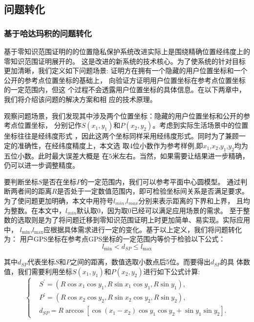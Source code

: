 \documentclass[zihao=-4]{ctexart}
\begin{document}
\subsection{问题转化}
\subsubsection{基于哈达玛积的问题转化}
基于零知识范围证明的的位置隐私保护系统改进实际上是围绕精确位置经纬度上的零知识范围证明展开的。
这是改进的新系统的技术核心。为了使系统的针对目标更加清晰，我们定义如下问题场景:
证明方在拥有一个隐藏的用户位置坐标和一个公开的参考点位置坐标的基础上，
向验证方证明用户位置坐标在参考点位置坐标的一定范围内，但这
个过程不会透露用户位置坐标的具体信息。在以下两章中，我们将介绍该问题的解决方案和相
应的技术原理。
\par
观察问题场景，我们发现其中涉及两个位置坐标：隐藏的用户位置坐标和公开的参考点位置坐标，
分别记作$S(x_1,y_1)$和$P(x_2,y_2)$。考虑到实际生活场景中的位置坐标往往是经纬度形式
，因此这两个坐标同样采用经纬度形式。同时为了兼顾一定的准确性，在经纬度精度上，本文选
取4位小数作为参考样例,即$x_1$,$x_2$,$y_1$,$y_2$均为五位小数。此时最大误差大概是
在$5$米左右。当然，如果需要让结果进一步精确，仍可以进一步调整精度。\par
要判断坐标$S$是否在坐标$P$的一定范围内，我们可以参考平面中心圆模型。
通过判断两者间的距离$R$是否处于一定数值范围内，即可检验坐标间关系是否满足要求。
为了使问题更加明确，本文中用符号$l_{min}$,$l_{max}$分别来表示距离的下界和上界，
且均为整数。在本文中，$l_{min}$默认取$0$，因为取$0$已经可以满足应用场景的需求。
至于整数的选取则是为了将问题迁移到零知识范围证明上时更加简单、易实现。实际应用中，
$l_{\min}$,$l_{\max}$应根据具体需求进行一定的变化。基于以上定义，我们将问题转化为：
用户GPS坐标在参考点GPS坐标的一定范围内等价于检验以下公式：
\begin{equation}l_{\min}< d_{SP}\leq l_{\max}\end{equation}\par
其中$d_{SP}$代表坐标$S$和$P$之间的距离，数值选取小数点后5位。而要得出$d_{SP}$的具
体数值，我们需要利用坐标$S(x_1,y_1)$和$P(x_2,y_2)$进行如下公式计算:
\begin{equation}
  \begin{cases}
    &S^{\prime}=(R\cos x_1\cos y_1,R\sin x_1\cos y_1,R\sin y_1),\\
    &P^{\prime}=(R\cos x_2\cos y_2,R\sin x_2\cos y_2,R\sin y_2),\\
    &d_{SP}=R\arccos[\cos(x_1-x_2)\cos y_1\cos y_2+\sin y_1\sin y_2].
  \end{cases}
\end{equation}\par
\end{document}

